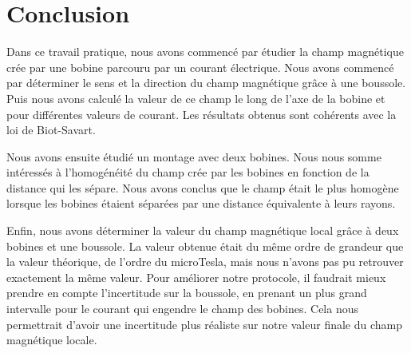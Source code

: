 \documentclass[12pt]{article}
\begin{document}
\newpage
\section*{Conclusion}

Dans ce travail pratique, nous avons commencé par étudier la champ magnétique crée par une bobine parcouru par un courant électrique. Nous avons commencé par déterminer le sens et la direction du champ magnétique grâce à une boussole. Puis nous avons calculé la valeur de ce champ le long de l'axe de la bobine et pour différentes valeurs de courant. Les résultats obtenus sont cohérents avec la loi de Biot-Savart. 

Nous avons ensuite étudié un montage avec deux bobines. Nous nous somme intéressés à l'homogénéité du champ crée par les bobines en fonction de la distance qui les sépare. Nous avons conclus que le champ était le plus homogène lorsque les bobines étaient séparées par une distance équivalente à leurs rayons. 

Enfin, nous avons déterminer la valeur du champ magnétique local grâce à deux bobines et une boussole. La valeur obtenue était du même ordre de grandeur que la valeur théorique, de l'ordre du microTesla, mais nous n'avons pas pu retrouver exactement la même valeur. Pour améliorer notre protocole, il faudrait mieux prendre en compte l'incertitude sur la boussole, en prenant un plus grand intervalle pour le courant qui engendre le champ des bobines. Cela nous permettrait d'avoir une incertitude plus réaliste sur notre valeur finale du champ magnétique locale. 
\end{document}

